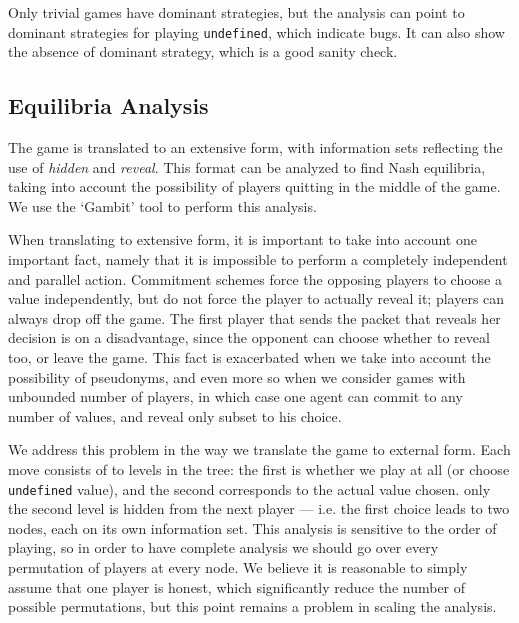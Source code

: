 \documentclass[acmsmall,review,anonymous]{acmart}\settopmatter{printfolios=true,printccs=false,printacmref=false}
\begin{document}
Only trivial games have dominant strategies, but the analysis can point to dominant strategies for playing \texttt{undefined}, which indicate bugs. It can also show the absence of dominant strategy, which is a good sanity check.

\subsection{Equilibria Analysis}
The game is translated to an extensive form, with information sets reflecting the use of \emph{hidden} and \emph{reveal}.
This format can be analyzed to find Nash equilibria, taking into account the possibility of players quitting in the middle of the game. We use the `Gambit' tool to perform this analysis.

When translating to extensive form, it is important to take into account one important fact, namely that it is impossible to perform a completely independent and parallel action. Commitment schemes force the opposing players to choose a value independently, but do not force the player to actually reveal it; players can always drop off the game. The first player that sends the packet that reveals her decision is on a disadvantage, since the opponent can choose whether to reveal too, or leave the game. This fact is exacerbated when we take into account the possibility of pseudonyms, and even more so when we consider games with unbounded number of players, in which case one agent can commit to any number of values, and reveal only subset to his choice.

We address this problem in the way we translate the game to external form. Each move consists of to levels in the tree: the first is whether we play at all (or choose \texttt{undefined} value), and the second corresponds to the actual value chosen. only the second level is hidden from the next player --- i.e. the first choice leads to two nodes, each on its own information set. This analysis is sensitive to the order of playing, so in order to have complete analysis we should go over every permutation of players at every node. We believe it is reasonable to simply assume that one player is honest, which significantly reduce the number of possible permutations, but this point remains a problem in scaling the analysis.
\end{document}
